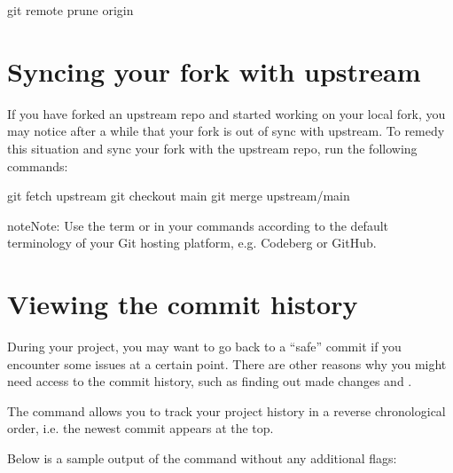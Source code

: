 \documentclass[a4paper,10pt,english,openany,oneside]{sphinxmanual}
\begin{document}
\begin{sphinxVerbatim}[commandchars=\\\{\}]
\PYGZdl{} git remote prune origin
\end{sphinxVerbatim}


\section{Syncing your fork with upstream}
\label{\detokenize{gitinminutes:syncing-your-fork-with-upstream}}
\sphinxAtStartPar
If you have forked an upstream repo and started working on your local fork, you may notice after a while that your fork is out of sync with upstream. To remedy this situation and sync your fork with the upstream repo, run the following commands:

\begin{sphinxVerbatim}[commandchars=\\\{\}]
\PYGZdl{} git fetch upstream
\PYGZdl{} git checkout main
\PYGZdl{} git merge upstream/main
\end{sphinxVerbatim}

\begin{sphinxadmonition}{note}{Note:}
\sphinxAtStartPar
Use the term  or  in your commands according to the default terminology of your Git hosting platform, e.g. Codeberg or GitHub.
\end{sphinxadmonition}


\section{Viewing the commit history}
\label{\detokenize{gitinminutes:viewing-the-commit-history}}
\sphinxAtStartPar
During your project, you may want to go back to a “safe” commit if you encounter some issues at a certain point. There are other reasons why you might need access to the commit history, such as finding out  made  changes and .

\sphinxAtStartPar
The  command allows you to track your project history in a reverse chronological order, i.e. the newest commit appears at the top.

\sphinxAtStartPar
Below is a sample output of the  command without any additional flags:
\end{document}
